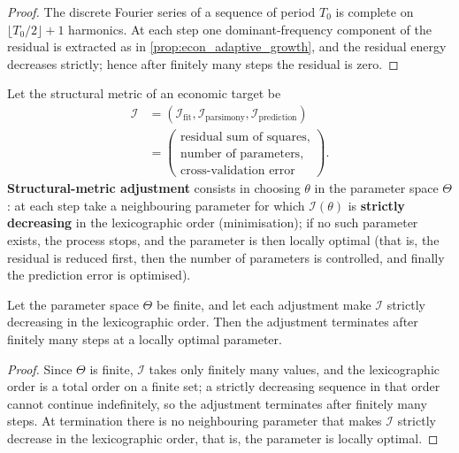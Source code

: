 \begin{proof}
The discrete Fourier series of a sequence of period $T_0$ is complete on $\lfloor T_0/2\rfloor+1$ harmonics. At each step one dominant-frequency component of the residual is extracted as in \cref{prop:econ_adaptive_growth}, and the residual energy decreases strictly; hence after finitely many steps the residual is zero.
\end{proof}

\begin{definition}\label{def:econ_structure_metric_adjustment}
Let the structural metric of an economic target be
\[
\begin{aligned}
\mathcal I
&=(\mathcal I_{\text{fit}},\mathcal I_{\text{parsimony}},\mathcal I_{\text{prediction}})\\
&=\left(\begin{array}{l}
\text{residual sum of squares},\\
\text{number of parameters},\\
\text{cross-validation error}
\end{array}\right).
\end{aligned}
\]
\textbf{Structural-metric adjustment} consists in choosing $\theta$ in the parameter space $\Theta$: at each step take a neighbouring parameter for which $\mathcal I(\theta)$ is \textbf{strictly decreasing} in the lexicographic order (minimisation); if no such parameter exists, the process stops, and the parameter is then locally optimal (that is, the residual is reduced first, then the number of parameters is controlled, and finally the prediction error is optimised).
\end{definition}

\begin{proposition}\label{prop:econ_structure_metric_convergence}
Let the parameter space $\Theta$ be finite, and let each adjustment make $\mathcal I$ strictly decreasing in the lexicographic order. Then the adjustment terminates after finitely many steps at a locally optimal parameter.
\end{proposition}

\begin{proof}
Since $\Theta$ is finite, $\mathcal I$ takes only finitely many values, and the lexicographic order is a total order on a finite set; a strictly decreasing sequence in that order cannot continue indefinitely, so the adjustment terminates after finitely many steps. At termination there is no neighbouring parameter that makes $\mathcal I$ strictly decrease in the lexicographic order, that is, the parameter is locally optimal.
\end{proof}

